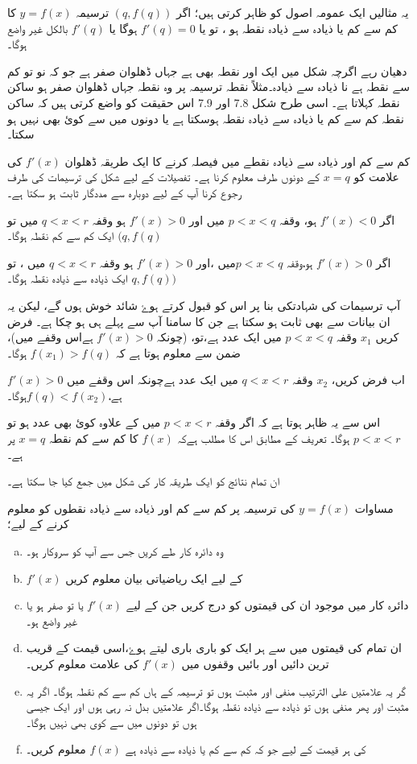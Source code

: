 یہ مثالیں ایک عمومہ اصول کو ظاہر کرتی ہیں؛
اگر    \( (q,f(q)) \) ترسیمہ   \(y=f(x) \)    کا کم سے کم یا ذیادہ سے ذیادہ نقطہ ہو ، تو یا    \( f'(q) =0 \)  ہوگا      یا \(f'(q) \) بالکل غیر واضع ہوگا۔

دھیان رہے اگرچہ شکل  میں ایک اور نقطہ بھی ہے جہاں ڈھلوان صفر ہے جو کہ نو تو کم سے نقطہ ہے نا ذیادہ سے ذیادہ۔مثلاً نقطہ       ترسیمہ پر وہ نقطہ جہاں ڈھلوان صفر ہو ساکن نقطہ کہلاتا ہے۔ اسی طرح شکل 7.8 اور 7.9 اس حقیقت کو واضع کرتی ہیں کہ ساکن نقطہ کم سے کم یا ذیادہ سے ذیادہ نقطہ ہوسکتا ہے یا دونوں میں سے کوئ بھی نہیں ہو سکتا۔

کم سے کم اور ذیادہ سے ذیادہ نقطے میں فیصلہ کرنے کا ایک طریقہ ڈھلوان     \(f'(x)\)     کی علامت کو  	 \( x=q \)	 کے  دونوں طرف معلوم کرنا ہے۔ تفصیلات کے لیے شکل کی ترسیمات کی طرف رجوع کرنا آپ کے لیے دوبارہ سے مددگار ثابت ہو سکتا ہے۔


اگر      \(f'(x)<0 \) ہو، وقفہ	 \(p < x < q \) میں اور  \( f'(x) >0 \)	 ہو وقفہ  \(q < x < r \) میں تو 	 \( (q,f(q) \)	 ایک کم سے کم نقطہ ہوگا۔

اگر	\(f'(x)>0\)	 ہو،وقفہ	\( p < x < q \)میں ،اور	\( f'(x)>0 \)	ہو وقفہ	\(q < x < r \)		میں ، تو 	\(q,f(q)) \) 	 ایک ذیادہ سے ذیادہ نقطہ ہوگا۔

آپ ترسیمات کی شہادتکی بنا پر اس کو قبول کرتے ہوۓ شائد خوش ہوں گے، لیکن یہ ان بیانات سے بھی ثابت ہو سکتا ہے جن کا سامنا آپ سے پہلے ہی ہو چکا ہے۔
فرض کریں \(x_1\)	   وقفہ  \(p < x < q \) 	میں ایک عدد ہے،تو، (چونکہ \( f'(x)>0 \)	ہےاس وقفے میں)، ضمن  سے معلوم ہوتا ہے کہ	\( f(x_{1})>f(q) \)  	ہوگا۔


اب فرض کریں،	\(x_2\)	وقفہ 	\(q < x < r \)	 میں ایک عدد ہےچونکہ اس وقفے میں \(f'(x)>0 \)ہے،\( f(q)<f(x_{2}) \)ہوگا۔

اس سے یہ ظاہر ہوتا ہے کہ اگر 	   وقفہ \(p < x < r \)		میں 		کے علاوہ کوئ بھی عدد ہو تو 	\(p < x < r \)	ہوگا۔ تعریف کے مطابق اس کا مطلب ہےکہ  \(f(x)\)  	کا کم سے کم نقطہ \(x=q\)		پر ہے۔ 	

ان تمام نتائج کو ایک طریقہ کار کی شکل میں جمع کیا جا سکتا ہے۔

مساوات	\(y=f(x) \)	کی ترسیمہ پر کم سے کم اور ذیادہ سے ذیادہ نقطوں کو معلوم کرنے کے لیے؛
\begin{enumerate}[a.]
\item
وہ دائرہ کار طے کریں جس سے آپ کو سروکار ہو۔
\item
 \(f'(x)\) کے لیے ایک ریاضیاتی بیان معلوم کریں
\item
 دائرہ کار میں موجود ان   کی قیمتوں کو درج کریں جن کے لیے \(f\prime(x)\)  یا تو صفر ہو یا غیر واضع ہو۔
\item
ان تمام    کی قیمتوں میں سے ہر ایک کو باری باری لیتے ہوۓ،اسی قیمت کے قریب ترین دائیں اور بائیں وقفوں میں	 \(f\prime(x)\)	کی علامت معلوم کریں۔
\item
گر یہ علامتیں علی الترتیب منفی اور مثبت ہوں تو ترسیمہ کے ہاں کم سے کم نقطہ ہوگا۔ اگر یہ مثبت اور پھر منفی ہوں تو ذیادہ سے ذیادہ نقطہ ہوگا۔اگر علامتیں بدل نہ رہی ہوں اور ایک جیسی ہوں تو دونوں میں سے کوی بھی نہیں ہوگا۔
\item
  کی ہر قیمت کے لیے جو کہ کم سے کم یا ذیادہ سے ذیادہ ہے  \(f(x)\) 	معلوم کریں۔
\end{enumerate}


